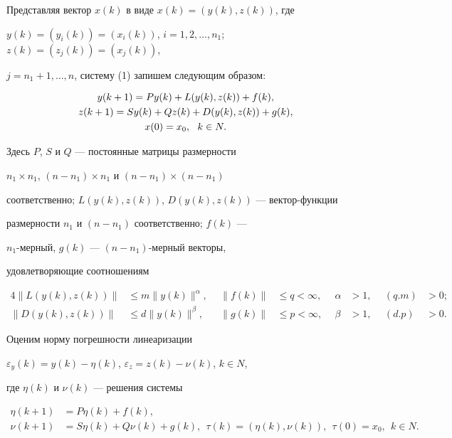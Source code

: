 Представляя вектор $x(k)$ в виде $x(k)=(y(k),z(k))$, где


$y(k)=(y_i(k))=(x_i(k))$, $i=1,2,\dotsc,n_1$; $z(k)=(z_j(k))=(x_j(k))$,


$j=n_1+1,\dotsc,n$, систему (1) запишем следующим образом:


\begin{gather}


y(k+1)=Py(k)+L(y(k),z(k))+f(k),\notag \\


z(k+1)=Sy(k)+Qz(k)+D(y(k),z(k))+g(k),\\


x(0)=x_0, \ \ k\in N.\notag 


\end{gather}


Здесь $P$, $S$ и $Q$ --- постоянные матрицы размерности


$n_1{\times} n_1$, $(n-n_1){\times} n_1$ и $(n-n_1){\times}(n-n_1)$


соответственно; $L(y(k),z(k))$, $D(y(k),z(k))$ --- вектор-функции


размерности $n_1$ и $(n-n_1)$ соответственно; $f(k)$ ---


$n_1$-мерный, $g(k)$ --- $(n-n_1)$-мерный векторы,


удовлетворяющие соотношениям


\begin{alignat*}{4}


\|L(y(k),z(k))\|&\le m\|y(k)\|^{\alpha},&\ \ \|f(k)\|&\le q<\infty,&\ \


\alpha&>1,&\ \ (q.m)&>0;\\


\|D(y(k),z(k))\|&\le d\|y(k)\|^{\beta},&\ \ \|g(k)\|&\le p<\infty,&\ \


\beta&>1,&\ \ (d.p)&>0.


\end{alignat*}





Оценим норму погрешности линеаризации


$\varepsilon_y(k)=y(k)-\eta(k)$, $\varepsilon_z=z(k)-\nu(k)$, $k\in N$,


где $\eta(k)$ и $\nu(k)$ --- решения системы


\begin{align*}


\eta(k+1)&=P\eta(k)+f(k),\\


\nu(k+1)&=S\eta(k)+Q\nu(k)+g(k),\ \ \tau(k)=(\eta(k),\nu(k)),\ \


\tau(0)=x_0,\ \ k\in N.


\end{align*}



